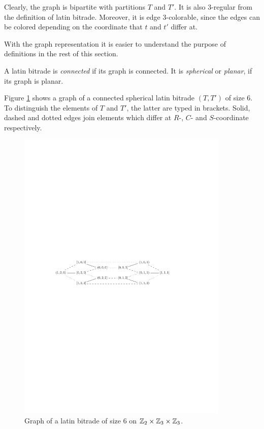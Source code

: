 Clearly, the graph is bipartite with partitions $T$ and $T'$. It is also 3-regular from the definition of latin bitrade. Moreover, it is edge 3-colorable, since the edges can be colored depending on the coordinate that $t$ and $t'$ differ at.

With the graph representation it is easier to understand the purpose of definitions in the rest of this section.

\begin{defn}
A latin bitrade is \emph{connected} if its graph is connected. It is \emph{spherical} or \emph{planar}, if its graph is planar.
\end{defn}

\begin{exmp}
\label{exmp:graph-bitrade}
Figure \ref{fig:graph-bitrade} shows a graph of a connected spherical latin bitrade $(T,T')$ of size 6. To distinguish the elements of $T$ and $T'$, the latter are typed in brackets. Solid, dashed and dotted edges join elements which differ at $R$-, $C$- and $S$-coordinate respectively.

\begin{figure}[htb]
\centering
\includegraphics[width=0.9\textwidth]{img/graph_example.pdf}
\caption{Graph of a latin bitrade of size 6 on $\mathbb Z_2 \times \mathbb Z_3 \times \mathbb Z_3$.}
\label{fig:graph-bitrade}
\end{figure}
\end{exmp}%


